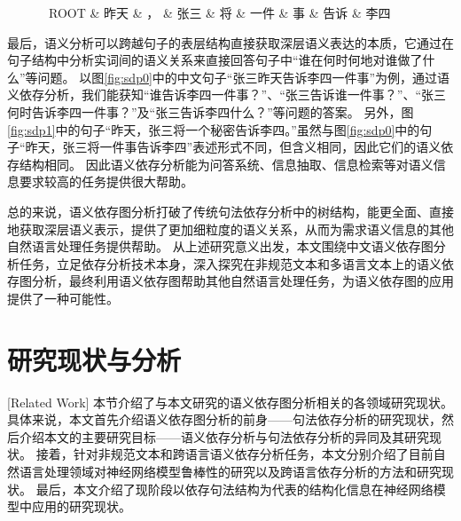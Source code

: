\begin{figure}[htb]
	\begin{center}
			\begin{dependency}[arc edge, arc angle=80, text only label, label style={above}]
				\begin{deptext} [row sep=0.4cm, column sep=.1cm]
					\ ROOT \& 昨天 \& ， \& 张三 \&  将  \& 一件 \& 事 \& 告诉 \& 李四  \\
				\end{deptext}
			\end{dependency}
	\end{center}
\end{figure}


最后，语义分析可以跨越句子的表层结构直接获取深层语义表达的本质，它通过在句子结构中分析实词间的语义关系来直接回答句子中“谁在何时何地对谁做了什么”等问题。
以图\ref{fig:sdp0}中的中文句子“张三昨天告诉李四一件事”为例，通过语义依存分析，我们能获知“谁告诉李四一件事？”、“张三告诉谁一件事？”、“张三何时告诉李四一件事？”及“张三告诉李四什么？”等问题的答案。
另外，图\ref{fig:sdp1}中的句子“昨天，张三将一个秘密告诉李四。”虽然与图\ref{fig:sdp0}中的句子“昨天，张三将一件事告诉李四”表述形式不同，但含义相同，因此它们的语义依存结构相同。
因此语义依存分析能为问答系统、信息抽取、信息检索等对语义信息要求较高的任务提供很大帮助。

总的来说，语义依存图分析打破了传统句法依存分析中的树结构，能更全面、直接地获取深层语义表示，提供了更加细粒度的语义关系，从而为需求语义信息的其他自然语言处理任务提供帮助。
从上述研究意义出发，本文围绕中文语义依存图分析任务，立足依存分析技术本身，深入探究在非规范文本和多语言文本上的语义依存图分析，最终利用语义依存图帮助其他自然语言处理任务，为语义依存图的应用提供了一种可能性。

\section{研究现状与分析}[Related Work]
本节介绍了与本文研究的语义依存图分析相关的各领域研究现状。
具体来说，本文首先介绍语义依存图分析的前身——句法依存分析的研究现状，然后介绍本文的主要研究目标——语义依存分析与句法依存分析的异同及其研究现状。
接着，针对非规范文本和跨语言语义依存分析任务，本文分别介绍了目前自然语言处理领域对神经网络模型鲁棒性的研究以及跨语言依存分析的方法和研究现状。
最后，本文介绍了现阶段以依存句法结构为代表的结构化信息在神经网络模型中应用的研究现状。

